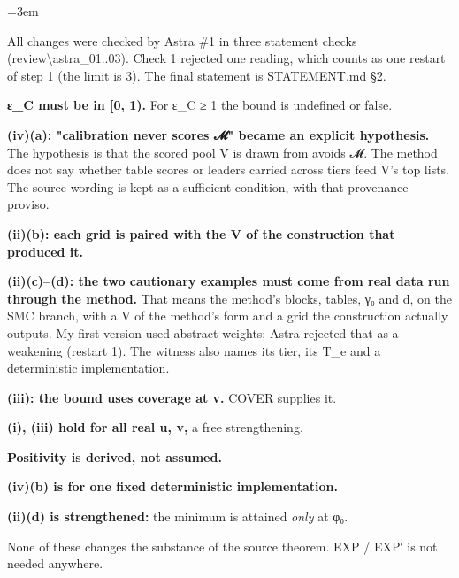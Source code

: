 \documentclass[11pt]{report}
\newcommand{\mdlbl}[1]{\textup{#1}}
\newenvironment{mdblock}{\begingroup\mdfont\raggedright\setlength{\parindent}{0pt}\setlength{\parskip}{0.55em}\emergencystretch=3em}{\par\endgroup}
\newcommand{\mdhead}[2]{\par\vspace{0.7em}\noindent{\bfseries\ifcase#1\or\large\or\normalsize\or\normalsize\or\small\or\small\or\small\fi #2}\par\nopagebreak\vspace{0.1em}}
\begin{document}
\begin{mdblock}
\mdhead{2}{2. Changes to the statement, and why}

All changes were checked by Astra \#1 in three statement checks ({\mdtt review\textbackslash{}\allowbreak{}astra\_\allowbreak{}01.\allowbreak{}.\allowbreak{}03}). Check 1 rejected one reading, which counts as one restart of step 1 (the limit is 3). The final statement is {\mdtt STATEMENT.\allowbreak{}md} §2.

\begin{mdnum}
\item[\mdlbl{1.}] \textbf{ε\_C must be in [0, 1).} For ε\_C ≥ 1 the bound is undefined or false.
\item[\mdlbl{2.}] \textbf{(iv)(a): "calibration never scores 𝓜" became an explicit hypothesis.} The hypothesis is that the scored pool V is drawn from avoids 𝓜. The method does not say whether table scores or leaders carried across tiers feed V's top lists. The source wording is kept as a sufficient condition, with that provenance proviso.
\item[\mdlbl{3.}] \textbf{(ii)(b): each grid is paired with the V of the construction that produced it.}
\item[\mdlbl{4.}] \textbf{(ii)(c)–(d): the two cautionary examples must come from real data run through the method.} That means the method's blocks, tables, γ₀ and d, on the SMC branch, with a V of the method's form and a grid the construction actually outputs. My first version used abstract weights; Astra rejected that as a weakening (restart 1). The witness also names its tier, its T\_e and a deterministic implementation.
\item[\mdlbl{5.}] \textbf{(iii): the bound uses coverage at v.} COVER supplies it.
\item[\mdlbl{6.}] \textbf{(i), (iii) hold for all real u, v,} a free strengthening.
\item[\mdlbl{7.}] \textbf{Positivity is derived, not assumed.}
\item[\mdlbl{8.}] \textbf{(iv)(b) is for one fixed deterministic implementation.}
\item[\mdlbl{9.}] \textbf{(ii)(d) is strengthened:} the minimum is attained \emph{only} at φ₀.
\end{mdnum}

None of these changes the substance of the source theorem. EXP / EXP′ is not needed anywhere.
\end{mdblock}
\end{document}
